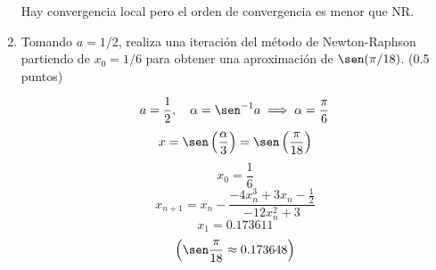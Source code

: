 \documentclass[12pt]{article}
\begin{document}
\begin{ejercicio}[4 puntos]
\begin{enumerate}
          Hay convergencia local pero el orden de convergencia es menor que NR.

          \item Tomando \( a = 1/2 \), realiza una iteración del método de Newton-Raphson partiendo de \( x_0 = 1/6 \) para obtener una aproximación de \( \sen(\pi/18) \). (0.5 puntos)         
          
          \[
          a = \frac12, \quad \alpha = \sen^{-1} a \implies \alpha = \frac{\pi}{6}
          \]
          \[
          x = \sen\left(\frac{\alpha}{3}\right) = \sen\left(\frac{\pi}{18}\right)
          \]
          \[
          x_0 = \frac16
          \]
          \[
          x_{n+1} = x_n - \frac{-4x_n^3 + 3x_n - \frac12}{-12x_n^2 + 3}
          \]
          \[
          x_1 = 0.173611
          \]
          \[
          \left(\sen\frac{\pi}{18} \approx 0.173648\right)
          \]

        \end{enumerate}
    \end{ejercicio}
\end{document}
